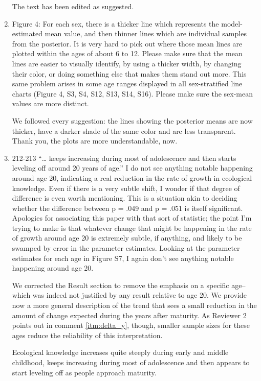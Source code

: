 \documentclass{article}
\newcommand{\rev}[1]{{\color{Red}#1}}
\newcommand{\comment}[1]{{\color{Blue}#1}}
\begin{document}
\begin{enumerate}
    \comment{The text has been edited as suggested. }

    \item Figure 4: For each sex, there is a thicker line which represents the model-estimated mean value, and then thinner lines which are individual samples from the posterior. It is very hard to pick out where those mean lines are plotted within the ages of about 6 to 12. Please make sure that the mean lines are easier to visually identify, by using a thicker width, by changing their color, or doing something else that makes them stand out more. This same problem arises in some age ranges displayed in all sex-stratified line charts (Figure 4, S3, S4, S12, S13, S14, S16). Please make sure the sex-mean values are more distinct.
    
    \comment{We followed every suggestion: the lines showing the posterior means are now thicker, have a darker shade of the same color and are less transparent. Thank you, the plots are more understandable, now.}

    \item 212-213 “… keeps increasing during most of adolescence and then starts leveling off around 20 years of age.” I do not see anything notable happening around age 20, indicating a real reduction in the rate of growth in ecological knowledge. Even if there is a very subtle shift, I wonder if that degree of difference is even worth mentioning. This is a situation akin to deciding whether the difference between p = .049 and p = .051 is itself significant. Apologies for associating this paper with that sort of statistic; the point I’m trying to make is that whatever change that might be happening in the rate of growth around age 20 is extremely subtle, if anything, and likely to be swamped by error in the parameter estimates. Looking at the parameter estimates for each age in Figure S7, I again don’t see anything notable happening around age 20.
    
    \comment{We corrected the Result section to remove the emphasis on a specific age--which was indeed not justified by any result relative to age 20. We provide now a more general description of the trend that sees a small reduction in the amount of change expected during the years after maturity. As Reviewer 2 points out in comment \ref{itm:delta_y}, though, smaller sample sizes for these ages reduce the reliability of this interpretation.  }
    
    \rev{Ecological knowledge increases quite steeply during early and middle childhood, keeps increasing during most of adolescence and then appears to start leveling off as people approach maturity}.


\end{enumerate}
\end{document}

